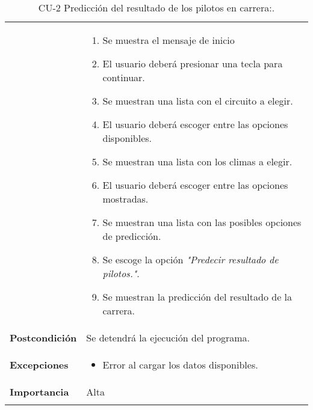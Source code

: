 \begin{longtable}[h!]{@{}ll@{}}
\begin{minipage}[t]{0.23\columnwidth}
\end{minipage} & \begin{minipage}[t]{0.71\columnwidth}\raggedright\strut
\begin{enumerate}
\def\labelenumi{\arabic{enumi}.}
\tightlist
\item 
  Se muestra  el mensaje de inicio
\item
  El usuario deberá presionar una tecla para continuar.  
\item
  Se muestran una lista con el circuito a elegir.
\item
  El usuario deberá escoger entre las opciones disponibles.
\item
  Se muestran una lista con los climas a elegir.
\item
  El usuario deberá escoger entre las opciones mostradas.
\item
  Se muestran una lista con las posibles opciones de predicción.
\item
  Se escoge la opción \textit{"Predecir resultado de pilotos."}.
\item
  Se muestran la predicción del resultado de la carrera.
\end{enumerate}\strut
\end{minipage}\tabularnewline
\begin{minipage}[t]{0.23\columnwidth}\raggedright\strut
\textbf{Postcondición}\strut
\end{minipage} & \begin{minipage}[t]{0.71\columnwidth}\raggedright\strut
Se detendrá la ejecución del programa.\strut
\end{minipage}\tabularnewline
\begin{minipage}[t]{0.23\columnwidth}\raggedright\strut
\textbf{Excepciones}\strut
\end{minipage} & \begin{minipage}[t]{0.71\columnwidth}\raggedright\strut
\begin{itemize}
\tightlist
\item
  Error al cargar los datos disponibles.
\end{itemize}\strut
\end{minipage}\tabularnewline
\begin{minipage}[t]{0.23\columnwidth}\raggedright\strut
\textbf{Importancia}\strut
\end{minipage} & \begin{minipage}[t]{0.71\columnwidth}\raggedright\strut
Alta\strut
\end{minipage}\tabularnewline
\bottomrule
\caption{CU-2 Predicción del resultado de los pilotos en carrera:.}
\end{longtable}

